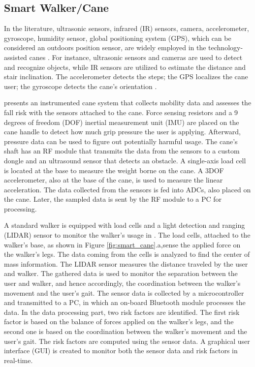 \subsection{Smart Walker/Cane} 

In the literature, ultrasonic sensors, infrared (IR) sensors, camera, accelerometer, gyroscope, humidity sensor, global positioning system (GPS), which can be considered an outdoors position sensor, are widely employed in the technology-assisted canes \parencite{khan_technology-assisted_2018}. For instance, ultrasonic sensors and cameras are used to detect and recognize objects, while IR sensors are utilized to estimate the distance and stair inclination. The accelerometer detects the steps; the GPS localizes the cane user; the gyroscope detects the cane's orientation \parencite{ahmad_multi-sensor_2018,leal-junior_plane-by-plane_2019,wade_feasibility_2019}.

\textcite{wade_feasibility_2019} presents an instrumented cane system that collects mobility data and assesses the fall risk with the sensors attached to the cane. Force sensing resistors and a 9 degrees of freedom (DOF) inertial measurement unit (IMU) are placed on the cane handle to detect how much grip pressure the user is applying. Afterward, pressure data can be used to figure out potentially harmful usage. The cane's shaft has an RF module that transmits the data from the sensors to a custom dongle and an ultrasound sensor that detects an obstacle. A single-axis load cell is located at the base to measure the weight borne on the cane. A 3DOF accelerometer, also at the base of the cane, is used to measure the linear acceleration. The data collected from the sensors is fed into ADCs, also placed on the cane. Later, the sampled data is sent by the RF module to a PC for processing. 

A standard walker is equipped with load cells and a light detection and ranging (LIDAR) sensor to monitor the walker's usage in \textcite{viegas_monitoring_2018}. The load cells, attached to the walker's base, as shown in Figure \ref{fig:smart_cane}.a,sense the applied force on the walker's legs. The data coming from the cells is analyzed to find the center of mass information. The LIDAR sensor measures the distance traveled by the user and walker. The gathered data is used to monitor the separation between the user and walker, and hence accordingly, the coordination between the walker's movement and the user's gait. The sensor data is collected by a microcontroller and transmitted to a PC, in which an on-board Bluetooth module processes the data. In the data processing part, two risk factors are identified. The first risk factor is based on the balance of forces applied on the walker's legs, and the second one is based on the coordination between the walker's movement and the user's gait. The risk factors are computed using the sensor data. A graphical user interface (GUI) is created to monitor both the sensor data and risk factors in real-time.

